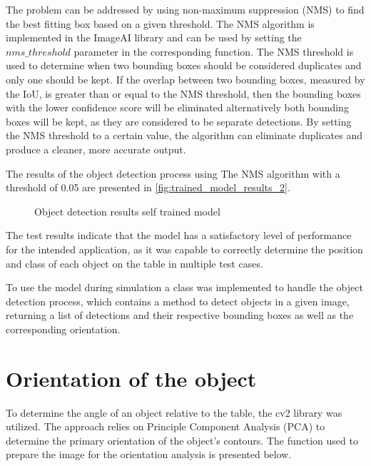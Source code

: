 The problem can be addressed by using non-maximum suppression (NMS) to find the best fitting box based on a given threshold. The NMS algorithm is implemented in the ImageAI library and can be used by setting the \(nms\_threshold\) parameter in the corresponding function. The NMS threshold is used to determine when two bounding boxes should be considered duplicates and only one should be kept. If the overlap between two bounding boxes, measured by the IoU, is greater than or equal to the NMS threshold, then  the bounding boxes with the lower confidence score will be eliminated alternatively both bounding boxes will be kept, as they are considered to be separate detections. By setting the NMS threshold to a certain value, the algorithm can eliminate duplicates and produce a cleaner, more accurate output. 

The results of the object detection process using The NMS algorithm with a threshold of 0.05 are presented in \vref{fig:trained_model_results_2}.

\begin{figure}[!h]
    \centering
    \caption{Object detection results self trained model }
    \label{fig:trained_model_results_2}
\end{figure}

The test results indicate that the model has a satisfactory level of performance for the intended application, as it was capable to correctly determine the position and class of each object on the table in multiple test cases. 

To use the model during simulation a class was implemented to handle the object detection process, which contains a method to detect objects in a given image, returning a list of detections and their respective bounding boxes as well as the corresponding orientation.

\section{Orientation of the object}

To determine the angle of an object relative to the table, the cv2 library was utilized. The approach relies on Principle Component Analysis (PCA) to determine the primary orientation of the object's contours. The function used to prepare the image for the orientation analysis is presented below.

